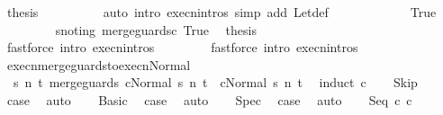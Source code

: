 \begin{isabellebody}
\ {\isacharquery}thesis\isanewline
\ \ \ \ \ \ \ \ \isamarkupfalse%
\ {\isacharparenleft}auto\ intro{\isacharcolon}\ execn{\isachardot}intros\ simp\ add{\isacharcolon}\ Let{\isacharunderscore}def{\isacharparenright}\isanewline
\ \ \ \ \isamarkupfalse%
\isanewline
\ \ \ \ \ \ \isamarkupfalse%
\ True\isanewline
\ \ \ \ \ \ \isamarkupfalse%
\ \ s{\isacharunderscore}notin{\isacharunderscore}g\ merge{\isacharunderscore}guards{\isacharunderscore}c\ True\ \isamarkupfalse%
\ {\isacharquery}thesis\ \isanewline
\ \ \ \ \ \ \ \ \isamarkupfalse%
\ {\isacharparenleft}fastforce\ intro{\isacharcolon}\ execn{\isachardot}intros{\isacharparenright}\isanewline
\ \ \ \ \isamarkupfalse%
\isanewline
\ \ \isamarkupfalse%
\isanewline
{}\isamarkupfalse%
\ {\isacharparenleft}fastforce\ intro{\isacharcolon}\ execn{\isachardot}intros{\isacharparenright}{\isacharplus}%
\endisatagproof
{\isafoldproof}%
%
\isadelimproof
\isanewline
%
\endisadelimproof
\isanewline
{}\isamarkupfalse%
\ execn{\isacharunderscore}merge{\isacharunderscore}guards{\isacharunderscore}to{\isacharunderscore}execn{\isacharunderscore}Normal{\isacharcolon}\isanewline
\ \ {\isachardoublequoteopen}{\isasymAnd}s\ n\ t{\isachardot}\ {\isasymGamma}{\isasymturnstile}{\isasymlangle}merge{\isacharunderscore}guards\ c{\isacharcomma}Normal\ s{\isasymrangle}\ {\isacharequal}n{\isasymRightarrow}\ t\ {\isasymLongrightarrow}\ {\isasymGamma}{\isasymturnstile}{\isasymlangle}c{\isacharcomma}Normal\ s{\isasymrangle}\ {\isacharequal}n{\isasymRightarrow}\ t{\isachardoublequoteclose}\ \isanewline
%
\isadelimproof
%
\endisadelimproof
%
\isatagproof
{}\isamarkupfalse%
\ {\isacharparenleft}induct\ c{\isacharparenright}\isanewline
\ \ \isamarkupfalse%
\ Skip\ \isamarkupfalse%
\ {\isacharquery}case\ \isamarkupfalse%
\ auto\isanewline
{}\isamarkupfalse%
\isanewline
\ \ \isamarkupfalse%
\ Basic\ \isamarkupfalse%
\ {\isacharquery}case\ \isamarkupfalse%
\ auto\isanewline
{}\isamarkupfalse%
\isanewline
\ \ \isamarkupfalse%
\ Spec\ \isamarkupfalse%
\ {\isacharquery}case\ \isamarkupfalse%
\ auto\isanewline
{}\isamarkupfalse%
\isanewline
\ \ \isamarkupfalse%
\ {\isacharparenleft}Seq\ c{}\ c{}{\isacharparenright}\ \isanewline
\ \ \isamarkupfalse%

\end{isabellebody}
